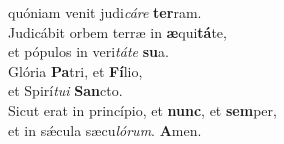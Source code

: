 \evenverse quóniam venit judi\textit{cá}\textit{re} \textbf{ter}ram.\\
\oddverse Judicábit orbem terræ in \textbf{æ}qui\textbf{tá}te,~\*\\
\oddverse et pópulos in veri\textit{tá}\textit{te} \textbf{su}a.\\
\evenverse Glória \textbf{Pa}tri, et \textbf{Fí}lio,~\*\\
\evenverse et Spirí\textit{tu}\textit{i} \textbf{San}cto.\\
\oddverse Sicut erat in princípio, et \textbf{nunc}, et \textbf{sem}per,~\*\\
\oddverse et in sǽcula sæcu\textit{ló}\textit{rum}. \textbf{A}men.\\

